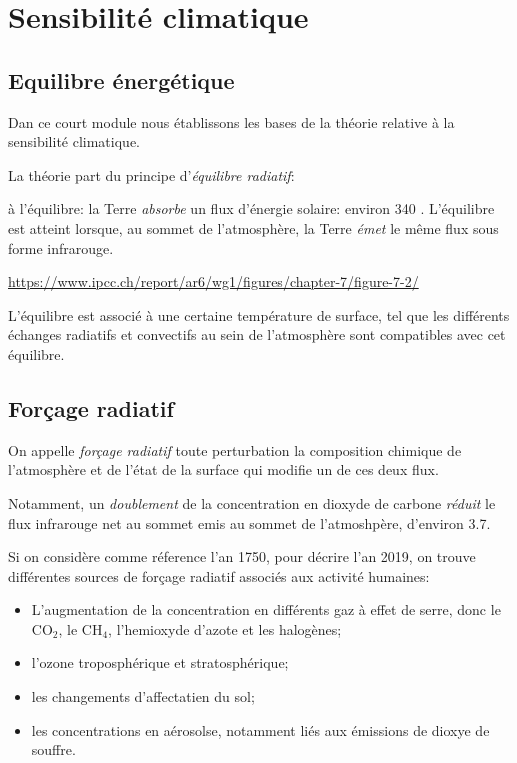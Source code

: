 \section{Sensibilit\'e climatique}

\subsection{Equilibre énergétique}

Dan ce court module nous établissons les bases de la théorie relative à la sensibilité climatique. 

La théorie part du principe d'\emph{équilibre radiatif}:

à l'équilibre: la Terre \emph{absorbe} un flux d'énergie solaire: environ 340 \wmm. L'équilibre est atteint lorsque, au sommet de l'atmosphère, la Terre \emph{émet} le même flux sous forme infrarouge. 

\url{https://www.ipcc.ch/report/ar6/wg1/figures/chapter-7/figure-7-2/}

L'équilibre est associé à une certaine température de surface, tel que les différents échanges radiatifs et convectifs au sein de l'atmosphère sont compatibles avec cet équilibre. 


\subsection{Forçage radiatif}

On appelle \emph{forçage radiatif} toute perturbation la composition chimique de l'atmosphère et de l'état de la surface qui modifie un de ces deux flux. 

Notamment, un \emph{doublement} de la concentration en dioxyde de carbone \emph{réduit} le flux infrarouge net au sommet emis au sommet de l'atmoshpère, d'environ 3.7\wmm. 


Si on considère comme réference l'an 1750, pour décrire l'an 2019, on trouve différentes sources de forçage radiatif associés aux activité humaines: 

\begin{itemize}
\item L'augmentation de la concentration en différents gaz à effet de serre, donc le CO$_2$, le CH$_4$, l'hemioxyde d'azote et les halogènes;
\item l'ozone troposphérique et stratosphérique;
\item les changements d'affectatien du sol;
\item les concentrations en aérosolse, notamment liés aux émissions de dioxye de souffre. 
\end{itemize}


